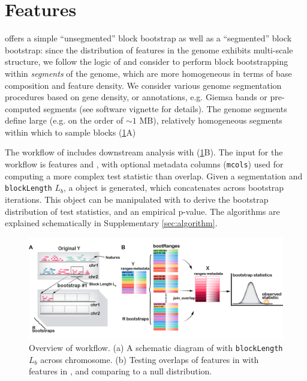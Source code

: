 \vspace*{-20pt}

\section{Features}
\bootranges offers a simple ``unsegmented'' block bootstrap as well as
a ``segmented'' block bootstrap:
since the distribution of features in the genome exhibits multi-scale
structure, we follow the logic of \citet{bickel2010subsampling} and consider to
perform block bootstrapping within \textit{segments} of the genome, which are
more homogeneous in terms of base composition and feature density.
We consider various genome segmentation procedures based on gene
density, or annotations, e.g. Giemsa bands or pre-computed segments
(see software vignette for details).
The genome segments define large (e.g. on the order of $\sim 1$ MB),
relatively homogeneous segments within which to sample blocks (\cref{fig:framework}A)

The workflow of \bootranges includes downstream analysis with
\plyranges (\cref{fig:framework}B).
The input for the workflow is \granges features  and
, with optional metadata columns (\texttt{mcols}) used for
computing a more complex test statistic than overlap.
Given a segmentation and \texttt{blockLength} $L_b$, a \bootranges
object is generated, which concatenates \granges across bootstrap
iterations. This \bootranges object can be manipulated with \plyranges
to derive the bootstrap distribution of test statistics, and an
empirical p-value.
The \bootranges algorithms are explained schematically in Supplementary \cref{sec:algorithm}.

\vspace{-0.3cm}
\begin{figure}[htbp]
\centering%
\setlength{\abovecaptionskip}{-0.05cm}
\includegraphics[scale=0.65]{Figures/bootRanges.jpg}
\caption{Overview of \bootranges workflow. (a) A schematic
  diagram of \bootranges with \texttt{blockLength} $L_b$ across chromosome.
  (b) Testing overlaps of features in  with features in
  , and comparing to a null distribution.} 
\label{fig:framework}
\vspace{-0.5cm}
\end{figure}

